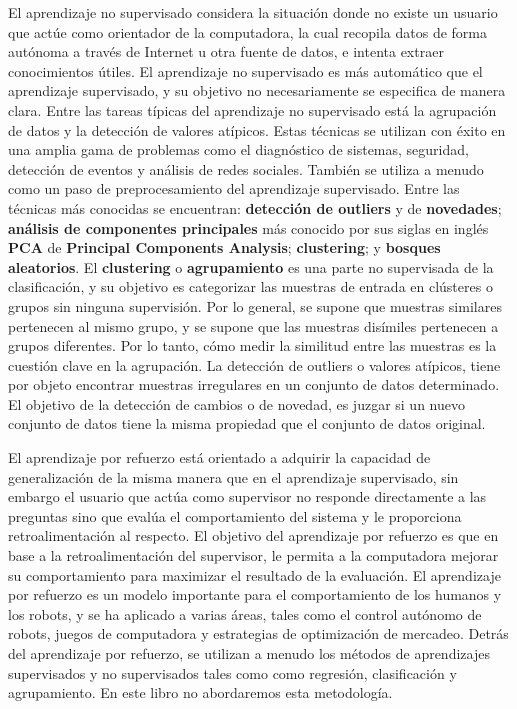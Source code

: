 \documentclass[12pt,]{krantz}
\begin{document}
El aprendizaje no supervisado considera la situación donde no existe un usuario que actúe como orientador de la computadora, la cual recopila datos de forma autónoma a través de Internet u otra fuente de datos, e intenta extraer conocimientos útiles. El aprendizaje no supervisado es más automático que el aprendizaje supervisado, y su objetivo no necesariamente se especifica de manera clara. Entre las tareas típicas del aprendizaje no supervisado está la agrupación de datos y la detección de valores atípicos. Estas técnicas se utilizan con éxito en una amplia gama de problemas como el diagnóstico de sistemas, seguridad, detección de eventos y análisis de redes sociales. También se utiliza a menudo como un paso de preprocesamiento del aprendizaje supervisado. Entre las técnicas más conocidas se encuentran: \textbf{detección de outliers} y de \textbf{novedades}; \textbf{análisis de componentes principales} más conocido por sus siglas en inglés \textbf{PCA} de \textbf{Principal Components Analysis}; \textbf{clustering}; y \textbf{bosques aleatorios}. El \textbf{clustering} o \textbf{agrupamiento} es una parte no supervisada de la clasificación, y su objetivo es categorizar las muestras de entrada en clústeres o grupos sin ninguna supervisión. Por lo general, se supone que muestras similares pertenecen al mismo grupo, y se supone que las muestras disímiles pertenecen a grupos diferentes. Por lo tanto, cómo medir la similitud entre las muestras es la cuestión clave en la agrupación. La detección de outliers o valores atípicos, tiene por objeto encontrar muestras irregulares en un conjunto de datos determinado. El objetivo de la detección de cambios o de novedad, es juzgar si un nuevo conjunto de datos tiene la misma propiedad que el conjunto de datos original.

El aprendizaje por refuerzo está orientado a adquirir la capacidad de generalización de la misma manera que en el aprendizaje supervisado, sin embargo el usuario que actúa como supervisor no responde directamente a las preguntas sino que evalúa el comportamiento del sistema y le proporciona retroalimentación al respecto. El objetivo del aprendizaje por refuerzo es que en base a la retroalimentación del supervisor, le permita a la computadora mejorar su comportamiento para maximizar el resultado de la evaluación. El aprendizaje por refuerzo es un modelo importante para el comportamiento de los humanos y los robots, y se ha aplicado a varias áreas, tales como el control autónomo de robots, juegos de computadora y estrategias de optimización de mercadeo. Detrás del aprendizaje por refuerzo, se utilizan a menudo los métodos de aprendizajes supervisados y no supervisados tales como como regresión, clasificación y agrupamiento. En este libro no abordaremos esta metodología.
\end{document}
